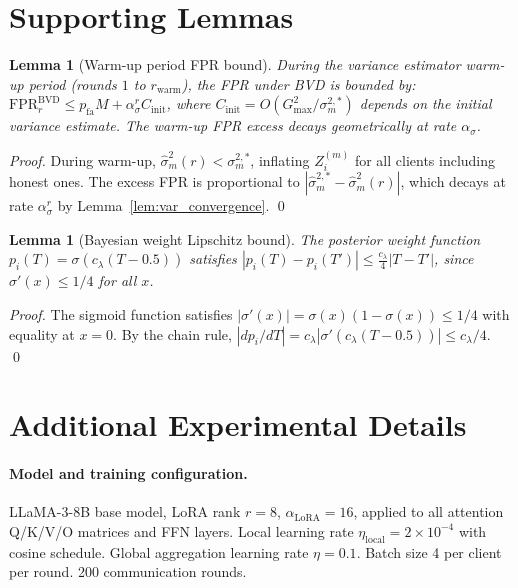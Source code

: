 \documentclass{article}
\newtheorem{lemma}[theorem]{Lemma}
\begin{document}



\appendix

\section{Supporting Lemmas}
\label{app:lemmas}

\begin{lemma}[Warm-up period FPR bound]
\label{lem:warmup_fpr}
During the variance estimator warm-up period (rounds $1$ to $r_{\mathrm{warm}}$),
the FPR under BVD is bounded by:
$\mathrm{FPR}_r^{\mathrm{BVD}} \leq p_{\mathrm{fa}} M + \alpha_\sigma^r C_{\mathrm{init}}$,
where $C_{\mathrm{init}} = O(G_{\max}^2 / \sigma_m^{2,*})$ depends on the
initial variance estimate.
The warm-up FPR excess decays geometrically at rate $\alpha_\sigma$.
\end{lemma}

\begin{proof}
During warm-up, $\hat\sigma_m^2(r) < \sigma_m^{2,*}$, inflating $Z_i^{(m)}$
for all clients including honest ones.
The excess FPR is proportional to $|\hat\sigma_m^{2,*} - \hat\sigma_m^2(r)|$,
which decays at rate $\alpha_\sigma^r$ by Lemma~\ref{lem:var_convergence}. \qed
\end{proof}

\begin{lemma}[Bayesian weight Lipschitz bound]
\label{lem:weight_lipschitz}
The posterior weight function $p_i(T) = \sigma(c_\lambda(T - 0.5))$
satisfies $|p_i(T) - p_i(T')| \leq \frac{c_\lambda}{4}|T - T'|$,
since $\sigma'(x) \leq 1/4$ for all $x$.
\end{lemma}

\begin{proof}
The sigmoid function satisfies $|\sigma'(x)| = \sigma(x)(1-\sigma(x)) \leq 1/4$
with equality at $x=0$.
By the chain rule, $|dp_i/dT| = c_\lambda|\sigma'(c_\lambda(T-0.5))| \leq c_\lambda/4$. \qed
\end{proof}

\section{Additional Experimental Details}
\label{app:exp}

\paragraph{Model and training configuration.}
LLaMA-3-8B base model, LoRA rank $r=8$, $\alpha_{\mathrm{LoRA}}=16$,
applied to all attention Q/K/V/O matrices and FFN layers.
Local learning rate $\eta_{\mathrm{local}} = 2\times 10^{-4}$ with cosine
schedule.
Global aggregation learning rate $\eta = 0.1$.
Batch size 4 per client per round.
200 communication rounds.
\end{document}
